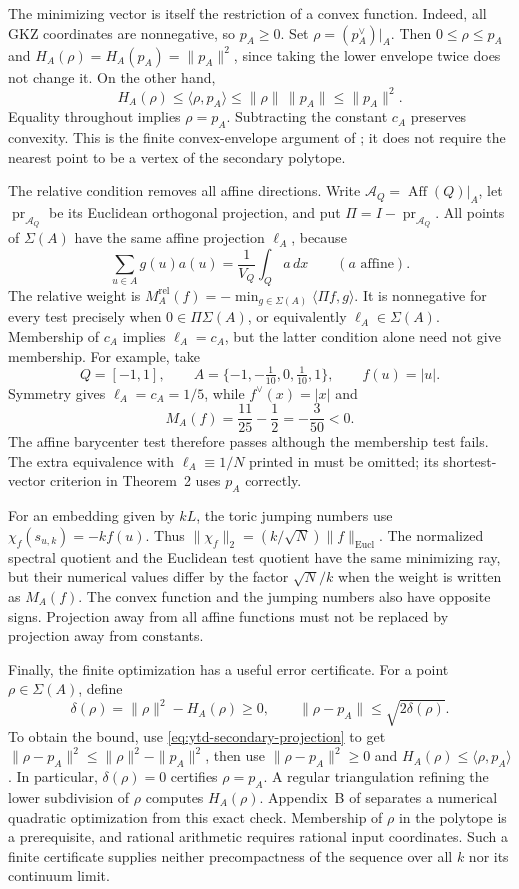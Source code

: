 The minimizing vector is itself the restriction of a convex function.
Indeed, all GKZ coordinates are nonnegative, so $p_A\geq0$.
Set $\rho=(p_A^\vee)|_A$. Then $0\leq\rho\leq p_A$ and
$H_A(\rho)=H_A(p_A)=\|p_A\|^2$, since taking the lower envelope
twice does not change it. On the other hand,
\[
 H_A(\rho)\leq\langle\rho,p_A\rangle
          \leq\|\rho\|\,\|p_A\|
          \leq\|p_A\|^2.
\]
Equality throughout implies $\rho=p_A$. Subtracting the constant
$c_A$ preserves convexity. This is the finite convex-envelope argument
of \cite[Theorem~37]{LSY26SecondaryPolytopesV1}; it does not require
the nearest point to be a vertex of the secondary polytope.

The relative condition removes all affine directions. Write
$\mathcal A_Q=\operatorname{Aff}(Q)|_A$, let
$\operatorname{pr}_{\mathcal A_Q}$ be its Euclidean orthogonal projection,
and put $\Pi=I-\operatorname{pr}_{\mathcal A_Q}$. All points of
$\Sigma(A)$ have the same affine projection $\ell_A$, because
\[
 \sum_{u\in A}g(u)a(u)=\frac{1}{V_Q}\int_Q a\,dx
 \qquad(a\text{ affine}).
\]
The relative weight is
$M_A^{\mathrm{rel}}(f)=-\min_{g\in\Sigma(A)}\langle\Pi f,g\rangle$.
It is nonnegative for every test precisely when
$0\in\Pi\Sigma(A)$, or equivalently $\ell_A\in\Sigma(A)$.
Membership of $c_A$ implies $\ell_A=c_A$, but the latter condition
alone need not give membership. For example, take
\[
 Q=[-1,1],\qquad A=\{-1,-\tfrac1{10},0,\tfrac1{10},1\},
 \qquad f(u)=|u|.
\]
Symmetry gives $\ell_A=c_A=1/5$, while $f^\vee(x)=|x|$ and
\[
 M_A(f)=\frac{11}{25}-\frac12=-\frac3{50}<0.
\]
The affine barycenter test therefore passes although the membership
test fails. The extra equivalence with $\ell_A\equiv1/N$ printed in
\cite[Theorem~29(1)]{LSY26SecondaryPolytopesV1} must be omitted;
its shortest-vector criterion in Theorem~2 uses $p_A$ correctly.

For an embedding given by $kL$, the toric jumping numbers use
$\chi_f(s_{u,k})=-k f(u)$. Thus
$\|\chi_f\|_2=(k/\sqrt N)\|f\|_{\mathrm{Eucl}}$.
The normalized spectral quotient and the Euclidean test quotient
have the same minimizing ray, but their numerical values differ by
the factor $\sqrt N/k$ when the weight is written as $M_A(f)$.
The convex function and the jumping numbers also have opposite signs.
Projection away from all affine functions must not be replaced by
projection away from constants.

Finally, the finite optimization has a useful error certificate.
For a point $\rho\in\Sigma(A)$, define
\[
 \delta(\rho)=\|\rho\|^2-H_A(\rho)\geq0,
 \qquad
 \|\rho-p_A\|\leq\sqrt{2\delta(\rho)}.
 \tag{68.23cv}\label{eq:ytd-secondary-gap}
\]
To obtain the bound, use \eqref{eq:ytd-secondary-projection} to get
$\|\rho-p_A\|^2\leq\|\rho\|^2-\|p_A\|^2$, then use
$\|\rho-p_A\|^2\geq0$ and
$H_A(\rho)\leq\langle\rho,p_A\rangle$.
In particular, $\delta(\rho)=0$ certifies $\rho=p_A$.
A regular triangulation refining the lower subdivision of $\rho$
computes $H_A(\rho)$. Appendix~B of
\cite{LSY26SecondaryPolytopesV1} separates a numerical quadratic
optimization from this exact check. Membership of $\rho$ in the
polytope is a prerequisite, and rational arithmetic requires rational
input coordinates. Such a finite certificate supplies neither
precompactness of the sequence over all $k$ nor its continuum limit.

